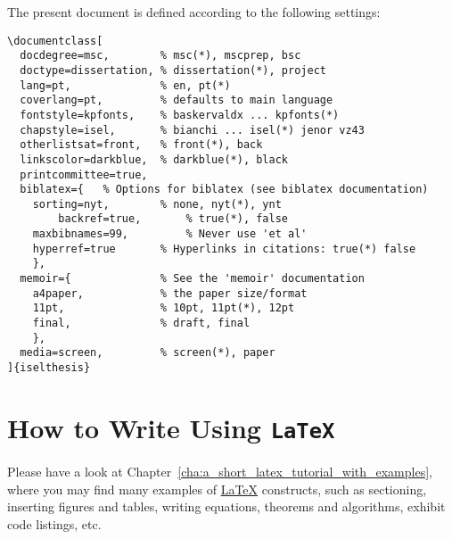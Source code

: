 The present document is defined according to the following settings:
\begin{Verbatim}[breaklines=true, breakanywhere=true]
\documentclass[
  docdegree=msc,        % msc(*), mscprep, bsc
  doctype=dissertation, % dissertation(*), project
  lang=pt,              % en, pt(*)
  coverlang=pt,         % defaults to main language
  fontstyle=kpfonts,    % baskervaldx ... kpfonts(*) 
  chapstyle=isel,       % bianchi ... isel(*) jenor vz43
  otherlistsat=front,   % front(*), back
  linkscolor=darkblue,  % darkblue(*), black 
  printcommittee=true,  
  biblatex={   % Options for biblatex (see biblatex documentation)
	sorting=nyt,        % none, nyt(*), ynt
        backref=true,       % true(*), false
    maxbibnames=99,			% Never use 'et al' 
    hyperref=true       % Hyperlinks in citations: true(*) false
	},
  memoir={	            % See the 'memoir' documentation
    a4paper,            % the paper size/format
    11pt,               % 10pt, 11pt(*), 12pt
    final,              % draft, final  
    },
  media=screen,         % screen(*), paper
]{iselthesis}
\end{Verbatim}

	
\section{How to Write Using \texttt{LaTeX}} %
\label{sec:how_to_write_using_latex}

Please have a look at Chapter~\ref{cha:a_short_latex_tutorial_with_examples}, where you may find many examples of \href{http://tobi.oetiker.ch/lshort/lshort.pdf}{\LaTeX} constructs, such as sectioning, inserting figures and tables, writing equations, theorems and algorithms, exhibit code listings, etc.

